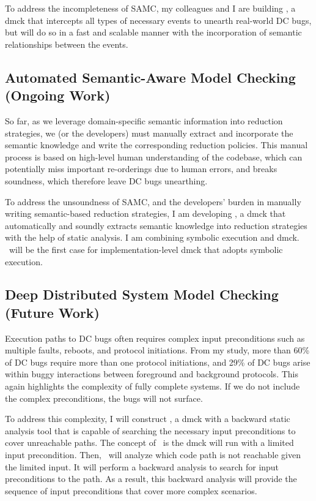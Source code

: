 \documentclass[11pt]{article}
\begin{document}
To address the incompleteness of SAMC, my colleagues and I are building
\fullcheck, a dmck that intercepts all types of necessary events to unearth
real-world DC bugs, but will do so in a fast and scalable manner with the
incorporation of semantic relationships between the events.
\fi

\subsection{Automated Semantic-Aware Model Checking (Ongoing Work)} 

So far, as we leverage domain-specific semantic information into reduction
strategies, we (or the developers) must manually extract and incorporate the
semantic knowledge and write the corresponding reduction policies. This manual
process is based on high-level human understanding of the codebase, which can
potentially miss important re-orderings due to human errors, and breaks
soundness, which therefore leave DC bugs unearthing.

To address the unsoundness of SAMC, and the developers' burden in manually
writing semantic-based reduction strategies, I am developing \autocheck, a dmck
that automatically and soundly extracts semantic knowledge into reduction
strategies with the help of static analysis. I am combining symbolic execution
and dmck. \autocheck\ will be the first case for implementation-level dmck that
adopts symbolic execution. 

\subsection{Deep Distributed System Model Checking (Future Work)}

Execution paths to DC bugs often requires complex input preconditions such as
multiple faults, reboots, and protocol initiations. From my study, more than
60\% of DC bugs require more than one protocol initiations, and 29\% of DC bugs
arise within buggy interactions between foreground and background protocols.
This again highlights the complexity of fully complete systems. If we do not
include the complex preconditions, the bugs will not surface.

To address this complexity, I will construct \deepcheck, a dmck with a backward
static analysis tool that is capable of searching the necessary input
preconditions to cover unreachable paths. The concept of \deepcheck\ is the dmck
will run with a limited input precondition. Then, \deepcheck\ will analyze which
code path is not reachable given the limited input. It will perform a backward
analysis to search for input preconditions to the path. As a result, this
backward analysis will provide the sequence of input preconditions that cover
more complex scenarios.
\end{document}
